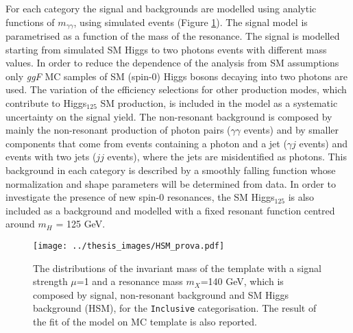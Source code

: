 \documentclass[a4paper, oneside, 11pt]{book}
\begin{document}
	For each category the signal and backgrounds are modelled using analytic functions of $m_{\gamma\gamma}$, using simulated events (Figure \ref{fig:mass_inv}). The signal model is parametrised as a function of the mass of the resonance. The signal is modelled starting from simulated SM Higgs to two photons events with different mass values. In order to reduce the dependence of the analysis from SM assumptions only \textit{ggF} MC samples of SM (spin-0) Higgs bosons decaying into two photons are used. The variation of the efficiency selections for other production modes, which contribute to Higgs$_{125}$ SM production, is included in the model as a systematic uncertainty on the signal yield. The non-resonant background is composed by mainly the non-resonant production of photon pairs ($\gamma\gamma$ events) and by smaller components that come from events containing a photon and a jet ($\gamma j$ events) and events with two jets ($jj$ events), where the jets are misidentified as photons. This background in each category is described by a smoothly falling function whose normalization and shape parameters will be determined from data. In order to investigate the presence of new spin-0 resonances, the SM Higgs$_{125}$ is also included as a background and modelled with a fixed resonant function centred around $m_H$ = 125 GeV.
	\begin{figure}
		\centering
		\texttt{[image: ../thesis\_images/HSM\_prova.pdf]}
		\caption{The distributions of the invariant mass of the template with a signal strength $\mu$=1 and a resonance mass $m_X$=140 GeV, which is composed by signal, non-resonant background and SM Higgs background (HSM), for the \texttt{Inclusive} categorisation. The result of the fit of the model on MC template is also reported.}
		\label{fig:mass_inv}
	\end{figure}
	
\end{document}
